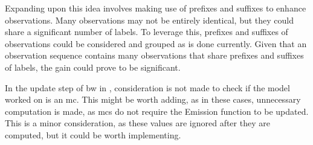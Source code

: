 Expanding upon this idea involves making use of prefixes and suffixes to enhance observations.
Many observations may not be entirely identical, but they could share a significant number of labels.
To leverage this, prefixes and suffixes of observations could be considered and grouped as is done currently.
Given that an observation sequence contains many observations that share prefixes and suffixes of labels, the gain could prove to be significant.

In the update step of \gls{bw} in \Cupaal, consideration is not made to check if the model worked on is an \gls{mc}.
This might be worth adding, as in these cases, unnecessary computation is made, as \glspl{mc} do not require the Emission function to be updated.
This is a minor consideration, as these values are ignored after they are computed, but it could be worth implementing.









